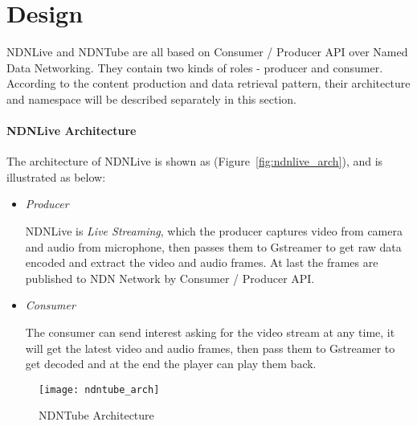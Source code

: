 \vspace{0.3cm}
\section{Design} %
\label{sec:arch}
NDNLive and NDNTube are all based on Consumer / Producer API over Named Data Networking. They contain two kinds of roles - producer and consumer. According to the content production and data retrieval pattern, their architecture and namespace will be described separately in this section. 

\paragraph{NDNLive Architecture} %
\vspace{0.3cm}
\label{par:ndnlive_arch}
The architecture of NDNLive is shown as (Figure~\ref{fig:ndnlive_arch}), and is illustrated as below:

\begin{itemize}
  \item \textit{Producer}

  NDNLive is \textit{Live Streaming}, which the producer captures video from camera and audio from microphone, then passes them to Gstreamer to get raw data encoded and extract the video and audio frames. At last the frames are published to NDN Network by Consumer / Producer API. 

  \item \textit{Consumer}

  The consumer can send interest asking for the video stream at any time, it will get the latest video and audio frames, then pass them to Gstreamer to get decoded and at the end the player can play them back. 

\end{itemize}

\begin{figure*}[htbp]
  \centering
  \texttt{[image: ndntube\_arch]}
  \caption{NDNTube Architecture}
  \label{fig:ndntube_arch}
\end{figure*}

